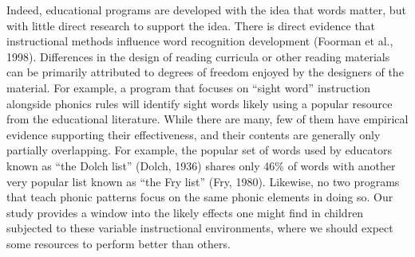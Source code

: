 \documentclass[
  ,man,floatsintext]{apa6}
\begin{document}
Indeed, educational programs are developed with the idea that words matter, but with little direct research to support the idea. There is direct evidence that instructional methods influence word recognition development (Foorman et al., 1998). Differences in the design of reading curricula or other reading materials can be primarily attributed to degrees of freedom enjoyed by the designers of the material. For example, a program that focuses on ``sight word'' instruction alongside phonics rules will identify sight words likely using a popular resource from the educational literature. While there are many, few of them have empirical evidence supporting their effectiveness, and their contents are generally only partially overlapping. For example, the popular set of words used by educators known as ``the Dolch list'' (Dolch, 1936) shares only 46\% of words with another very popular list known as ``the Fry list'' (Fry, 1980). Likewise, no two programs that teach phonic patterns focus on the same phonic elements in doing so. Our study provides a window into the likely effects one might find in children subjected to these variable instructional environments, where we should expect some resources to perform better than others.
\end{document}
